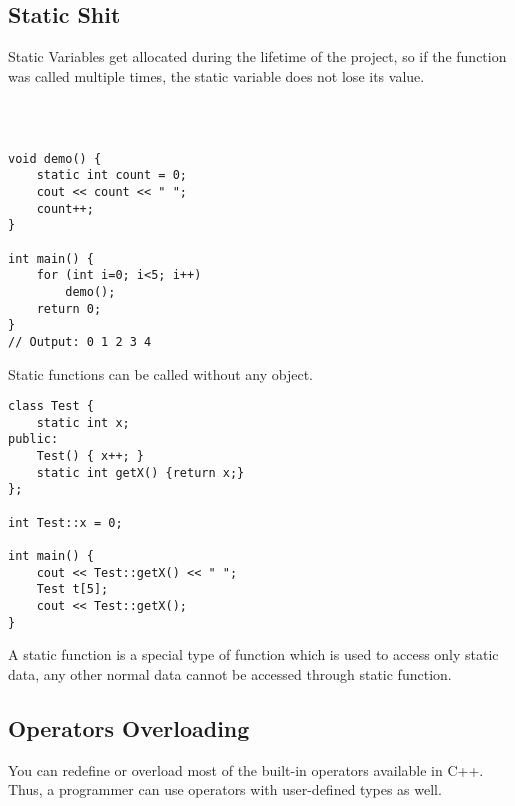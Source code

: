 \documentclass{article}
\begin{document}
\subsection{Static Shit}

Static Variables get allocated during the lifetime of the project, so if the function was called multiple times, the static variable does not lose its value.

\
\begin{lstlisting}

void demo() {  
    static int count = 0; 
    cout << count << " "; 
    count++; 
} 
  
int main() { 
    for (int i=0; i<5; i++)     
        demo(); 
    return 0; 
} 
// Output: 0 1 2 3 4 
\end{lstlisting}

Static functions can be called without any object.

\begin{lstlisting}
class Test {
    static int x;
public:
    Test() { x++; }
    static int getX() {return x;}
};
 
int Test::x = 0;
 
int main() {
    cout << Test::getX() << " ";
    Test t[5];
    cout << Test::getX();
}
\end{lstlisting}

 A static function is a special type of function which is used to access only static data, any other normal data cannot be accessed through static function.

\newpage

\subsection{Operators Overloading}
You can redefine or overload most of the built-in operators available in C++. Thus, a programmer can use operators with user-defined types as well.
\end{document}
